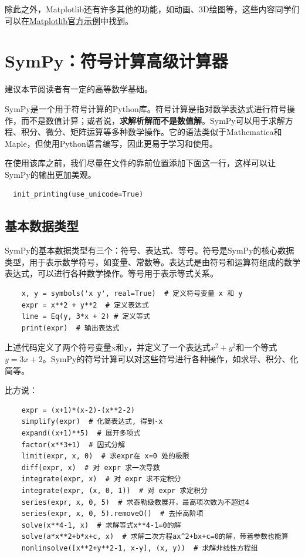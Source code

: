 除此之外，Matplotlib还有许多其他的功能，如动画、3D绘图等，这些内容同学们可以在\href{https://matplotlib.org/stable/gallery/index.html}{Matplotlib官方示例}中找到。

\section{SymPy：符号计算高级计算器}

\begin{flushright}
建议本节阅读者有一定的高等数学基础。
\end{flushright}

SymPy是一个用于符号计算的Python库。符号计算是指对数学表达式进行符号操作，而不是数值计算；或者说，\textbf{求解析解而不是数值解}。SymPy可以用于求解方程、积分、微分、矩阵运算等多种数学操作。它的语法类似于Mathematica和Maple，但使用Python语言编写，因此更易于学习和使用。

在使用该库之前，我们尽量在文件的靠前位置添加下面这一行，这样可以让SymPy的输出更加美观。
\begin{verbatim}
  init_printing(use_unicode=True)
\end{verbatim}

\subsection{基本数据类型}
SymPy的基本数据类型有三个：符号、表达式、等号。符号是SymPy的核心数据类型，用于表示数学符号，如变量、常数等。表达式是由符号和运算符组成的数学表达式，可以进行各种数学操作。等号用于表示等式关系。
\begin{verbatim}
    x, y = symbols('x y', real=True)  # 定义符号变量 x 和 y
    expr = x**2 + y**2  # 定义表达式
    line = Eq(y, 3*x + 2) # 定义等式
    print(expr)  # 输出表达式
\end{verbatim}
上述代码定义了两个符号变量x和y，并定义了一个表达式$x^2 + y^2$和一个等式$y = 3x + 2$。SymPy的符号计算可以对这些符号进行各种操作，如求导、积分、化简等。

比方说：
\begin{verbatim}
    expr = (x+1)*(x-2)-(x**2-2)
    simplify(expr)  # 化简表达式, 得到-x
    expand((x+1)**5)  # 展开多项式
    factor(x**3+1)  # 因式分解
    limit(expr, x, 0)  # 求expr在 x=0 处的极限
    diff(expr, x)  # 对 expr 求一次导数
    integrate(expr, x)  # 对 expr 求不定积分
    integrate(expr, (x, 0, 1))  # 对 expr 求定积分
    series(expr, x, 0, 5)  # 求泰勒级数展开，最高项次数为不超过4
    series(expr, x, 0, 5).removeO()  # 去掉高阶项
    solve(x**4-1, x)  # 求解等式x**4-1=0的解
    solve(a*x**2+b*x+c, x)  # 求解二次方程ax^2+bx+c=0的解，带着参数也能算
    nonlinsolve([x**2+y**2-1, x-y], (x, y))  # 求解非线性方程组
\end{verbatim}

